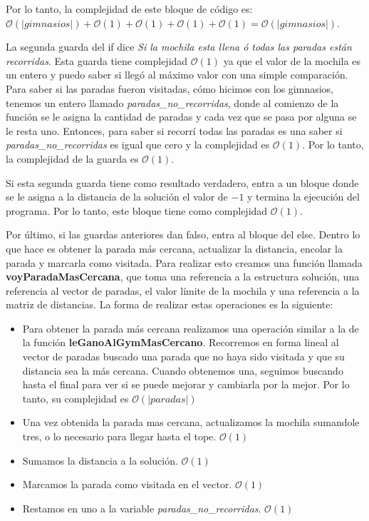 Por lo tanto, la complejidad de este bloque de código es: $\mathcal{O}(|gimnasios|) + \mathcal{O}(1) + \mathcal{O}(1) + \mathcal{O}(1) + \mathcal{O}(1) = \mathcal{O}(|gimnasios|)$.

La segunda guarda del if dice \textit{Si la mochila esta llena ó todas las paradas están recorridas}. Esta guarda tiene complejidad $\mathcal{O}(1)$ ya que el valor de la mochila es un entero y puedo saber si llegó al máximo valor con una simple comparación. Para saber si las paradas fueron visitadas, cómo hicimos con los gimnasios, tenemos un entero llamado \emph{paradas\_no\_recorridas}, donde al comienzo de la función se le asigna la cantidad de paradas y cada vez que se pasa por alguna se le resta uno. Entonces, para saber si recorrí todas las paradas es una saber si \emph{paradas\_no\_recorridas} es igual que cero y la complejidad es $\mathcal{O}(1)$. Por lo tanto, la complejidad de la guarda es $\mathcal{O}(1)$.

Si esta segunda guarda tiene como resultado verdadero, entra a un bloque donde se le asigna a la distancia de la solución el valor de $-1$ y termina la ejecución del programa. Por lo tanto, este bloque tiene como complejidad $\mathcal{O}(1)$.

Por último, si las guardas anteriores dan falso, entra al bloque del else. Dentro lo que hace es obtener la parada más cercana, actualizar la distancia, encolar la parada y marcarla como visitada. Para realizar esto creamos una función llamada \textbf{voyParadaMasCercana}, que toma una referencia a la estructura solución, una referencia al vector de paradas, el valor límite de la mochila y una referencia a la matriz de distancias. La forma de realizar estas operaciones es la siguiente:

\begin{itemize}

	\item Para obtener la parada más cercana realizamos una operación similar a la de la función \textbf{leGanoAlGymMasCercano}. Recorremos en forma lineal al vector de paradas buscado una parada que no haya sido visitada y que su distancia sea la más cercana. Cuando obtenemos una, seguimos buscando hasta el final para ver si se puede mejorar y cambiarla por la mejor. Por lo tanto, su complejidad es $\mathcal{O}(|paradas|)$
	\item Una vez obtenida la parada mas cercana, actualizamos la mochila sumandole tres, o lo necesario para llegar hasta el tope. $\mathcal{O}(1)$
	\item Sumamos la distancia a la solución. $\mathcal{O}(1)$
	\item Marcamos la parada como visitada en el vector. $\mathcal{O}(1)$
	\item Restamos en uno a la variable \emph{paradas\_no\_recorridas}. $\mathcal{O}(1)$

\end{itemize}

